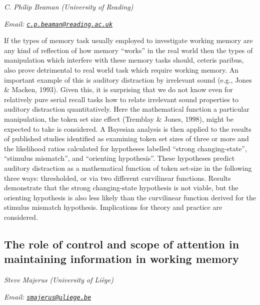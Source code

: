 \documentclass[12pt,]{book}
\begin{document}
\emph{C. Philip Beaman (University of Reading)}

\emph{Email: \href{mailto:c.p.beaman@reading.ac.uk}{\nolinkurl{c.p.beaman@reading.ac.uk}}}

If the types of memory task usually employed to investigate working memory are any kind of reflection of how memory ``works'' in the real world then the types of manipulation which interfere with these memory tasks should, ceteris paribus, also prove detrimental to real world task which require working memory. An important example of this is auditory distraction by irrelevant sound (e.g., Jones \& Macken, 1993). Given this, it is surprising that we do not know even for relatively pure serial recall tasks how to relate irrelevant sound properties to auditory distraction quantitatively. Here the mathematical function a particular manipulation, the token set size effect (Tremblay \& Jones, 1998), might be expected to take is considered. A Bayesian analysis is then applied to the results of published studies identified as examining token set sizes of three or more and the likelihood ratios calculated for hypotheses labelled ``strong changing-state'', ``stimulus mismatch'', and ``orienting hypothesis''. These hypotheses predict auditory distraction as a mathematical function of token set-size in the following three ways: thresholded, or via two different curvilinear functions. Results demonstrate that the strong changing-state hypothesis is not viable, but the orienting hypothesis is also less likely than the curvilinear function derived for the stimulus mismatch hypothesis. Implications for theory and practice are considered.

\hypertarget{the-role-of-control-and-scope-of-attention-in-maintaining-information-in-working-memory}{%
\subsection{The role of control and scope of attention in maintaining information in working memory}\label{the-role-of-control-and-scope-of-attention-in-maintaining-information-in-working-memory}}

\emph{Steve Majerus (University of Liège)}

\emph{Email: \href{mailto:smajerus@uliege.be}{\nolinkurl{smajerus@uliege.be}}}
\end{document}
